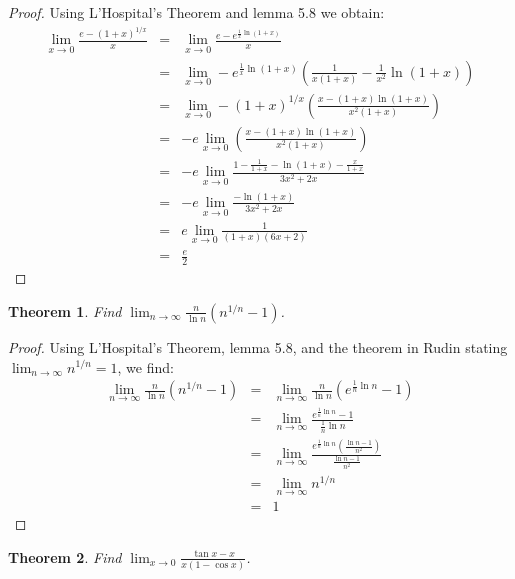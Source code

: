 \documentclass[psamsfonts]{amsart}
\newtheorem{thm}{Theorem}[section]
\theoremstyle{definition}
\theoremstyle{remark}
\numberwithin{equation}{section}
\begin{document}
\begin{proof}
Using L'Hospital's Theorem and lemma 5.8 we obtain:
\begin{eqnarray}
\lim_{x \to 0} \frac{e - (1+x)^{1/x}}{x} &=& \lim_{x \to 0} \frac{e - e^{\frac{1}{x} \ln(1+x)}}{x} \\
&=& \lim_{x \to 0} - e^{\frac{1}{x} \ln(1+x) } \left( \frac{1}{x(1+x)} - \frac{1}{x^2} \ln(1+x) \right) \\
&=& \lim_{x \to 0} - (1+x)^{1/x} \left( \frac{x - (1+x)\ln(1+x)}{x^2(1+x)} \right) \\
&=& -e \lim_{x \to 0}  \left( \frac{x - (1+x)\ln(1+x)}{x^2(1+x)} \right) \\
&=& -e \lim_{x \to 0} \frac{1 - \frac{1}{1+x} - \ln(1+x) - \frac{x}{1+x}}{3x^2 + 2x} \\
&=& -e \lim_{x \to 0} \frac{-\ln(1+x)}{3x^2 + 2x} \\
&=& e \lim_{x \to 0} \frac{1}{(1+x) (6x + 2)} \\
&=& \frac{e}{2}
\end{eqnarray}
\end{proof}

\begin{thm}
Find $\lim_{n \to \infty} \frac{n}{\ln n} (n^{1/n} - 1)$. 
\end{thm}

\begin{proof}
Using L'Hospital's Theorem, lemma 5.8, and the theorem in Rudin stating $\lim_{n \to \infty} n^{1/n} = 1$, we find:
\begin{eqnarray}
\lim_{n \to \infty} \frac{n}{\ln n} (n^{1/n} -1) &=& \lim_{n \to \infty} \frac{n}{\ln n} (e^{\frac{1}{n} \ln n} - 1)\\
&=&  \lim_{n \to \infty} \frac{ e^{\frac{1}{n} \ln n} - 1}{\frac{1}{n} \ln n} \\
&=& \lim_{n \to \infty} \frac{ e^{\frac{1}{n} \ln n} \left( \frac{\ln n - 1}{n^2} \right) }{ \frac{\ln n - 1}{n^2}} \\
&=& \lim_{n \to \infty} n^{1/n} \\
&=& 1
\end{eqnarray}
\end{proof}

\begin{thm}
Find $\lim_{x \to 0} \frac{ \tan x - x}{x ( 1 - \cos x)}$. 
\end{thm}
\end{document}
